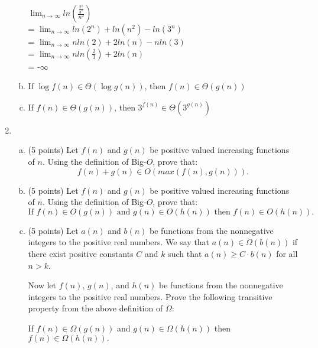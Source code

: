 \documentclass[11pt,letterpaper,unboxed,cm]{hmcpset}
\begin{document}
\begin{enumerate}
\begin{enumerate}[(a)]
\bigskip
$\lim_{n\to\infty} ln(\frac{\frac{2^n}{3^n}}{n^2})$ \\
= $\lim_{n\to\infty} ln(2^n) + ln(n^2) - ln(3^n)$ \\
= $\lim_{n\to\infty} nln(2) + 2ln(n) - nln(3)$ \\
= $\lim_{n\to\infty} nln(\frac{2}{3}) + 2ln(n)$ \\
= -$\infty$
\bigskip

\item  If $\log f(n) \in \Theta(\log g(n))$, then $f(n) \in \Theta(g(n))$




\item  If $f(n) \in \Theta(g(n))$, then $3^{f(n)} \in \Theta(3^{g(n)})$




\end{enumerate}



\bigskip
\item

\begin{enumerate}[(a)]

\item (5 points) Let $f(n)$ and $g(n)$ be positive valued increasing functions of $n$. Using the definition of Big-$O$, prove that:
$$f(n) + g(n) \in O(max(f(n),g(n))).$$




\item (5 points)
Let $f(n)$ and $g(n)$ be positive valued increasing functions of $n$. Using the definition of Big-$O$, prove that:
$$\text{If    }f(n)\in O(g(n))\text{   and   }
g(n) \in O(h(n))\text{   then   } f(n) \in O(h(n)).$$





\item (5 points) Let $a(n)$ and $b(n)$ be functions from the nonnegative integers to the positive real numbers. We say that $a(n)\in \Omega(b(n))$ if there exist positive constants $C$ and $k$ such that $a(n) \geq C \cdot b(n)$ for all $n>k$.

Now let $f(n)$, $g(n)$, and $h(n)$ be functions from the nonnegative integers to the positive real numbers. Prove the following transitive property from the above definition of $\Omega$:
\begin{center}
If $f (n) \in \Omega(g (n))$ and $g (n) \in \Omega(h(n))$ then
$f (n) \in \Omega(h(n)).$
\end{center}




\end{enumerate}
\end{enumerate}
\end{document}
